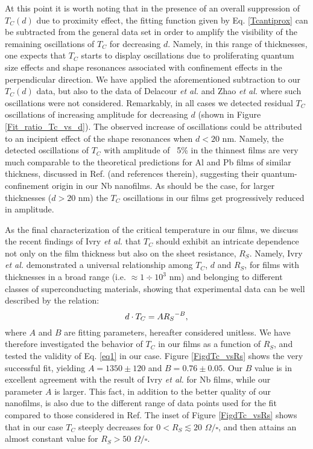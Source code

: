 \documentclass[reprint,onecolumn,superscriptaddress,a4paper,nofootinbib,floatfix]{revtex4-1}
\begin{document}
At this point it is worth noting that in the presence of an overall suppression of $T_C(d)$ due to proximity effect, the fitting function given by Eq. \eqref{Tcantiprox} can be subtracted from the general data set in order to amplify the visibility of the remaining oscillations of $T_C$ for decreasing $d$. Namely, in this range of thicknesses, one expects that $T_C$ starts to display oscillations due to proliferating quantum size effects and shape resonances associated with confinement effects in the perpendicular direction. We have applied the aforementioned subtraction to our $T_C(d)$ data, but also to the data of Delacour \textit{et al.} \cite{Delacour} and Zhao \textit{et al.}\cite{Zhao} where such oscillations were not considered. Remarkably, in all cases we detected residual $T_C$ oscillations of increasing amplitude for decreasing $d$ (shown in Figure \ref{Fit_ratio_Tc_vs_d}). The observed increase of oscillations could be attributed to an incipient effect of the shape resonances when $d < 20$ nm. Namely, the detected oscillations of $T_C$ with amplitude of ~5\% in the thinnest films are very much comparable to the theoretical predictions for Al and Pb films of similar thickness, discussed in Ref.\cite{Shanenko2006B} (and references therein), suggesting their quantum-confinement origin in our Nb nanofilms. As should be the case, for larger thicknesses ($d >20$ nm) the $T_C$ oscillations in our films get progressively reduced in amplitude.

As the final characterization of the critical temperature in our films, we discuss the recent findings of Ivry \textit{et al.}\cite{Ivry2014} that $T_C$ should exhibit an intricate dependence not only on the film thickness but also on the sheet resistance, $R_S$. Namely, Ivry \textit{et al.} demonstrated a universal relationship among $T_C$, $d$ and $R_S$, for films with thicknesses in a broad range (i.e. $\approx 1 \div 10^3$ nm) and belonging to different classes of superconducting materials, \cite{Ivry2014} showing that experimental data can be well described by the relation:
\begin{equation}
\centering
\label{eq1}
d\cdot T_C = A{R_S}^{-B},
\end{equation}
where $A$ and $B$ are fitting parameters, hereafter considered unitless. We have therefore investigated the behavior of $T_C$ in our films as a function of $R_S$, and tested the validity of Eq. \eqref{eq1} in our case. Figure \ref{FigdTc_vsRs} shows the very successful fit, yielding $A = 1350 \pm 120$ and $B = 0.76\pm 0.05$. Our $B$ value is in excellent agreement with the result of Ivry \textit{et al.} for Nb films, while our parameter $A$ is larger.\cite{Ivry2014,Ivry2014_Supplemental} This fact, in addition to the better quality of our nanofilms, is also due to the different range of data points used for the fit compared to those considered in Ref.\cite{Ivry2014} The inset of Figure \ref{FigdTc_vsRs} shows that in our case $T_C$ steeply decreases for $0 < R_S \lesssim 20$ $\Omega/\square$, and then attains an almost constant value for $R_S > 50$ $\Omega/\square$. 
\end{document}
